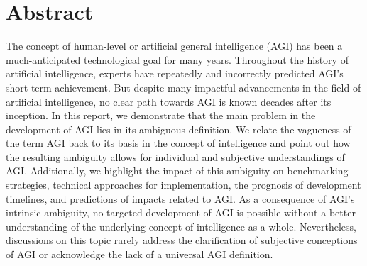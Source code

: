\section*{Abstract}
The concept of human-level or artificial general intelligence (AGI) has been a much-anticipated technological goal for many years.
Throughout the history of artificial intelligence, experts have repeatedly and incorrectly predicted AGI's short-term achievement.
But despite many impactful advancements in the field of artificial intelligence, no clear path towards AGI is known decades after its inception.
In this report, we demonstrate that the main problem in the development of AGI lies in its ambiguous definition.
We relate the vagueness of the term AGI back to its basis in the concept of intelligence and point out how the resulting ambiguity allows for individual and subjective understandings of AGI.
Additionally, we highlight the impact of this ambiguity on benchmarking strategies, technical approaches for implementation, the prognosis of development timelines, and predictions of impacts related to AGI.
As a consequence of AGI's intrinsic ambiguity, no targeted development of AGI is possible without a better understanding of the underlying concept of intelligence as a whole.
Nevertheless, discussions on this topic rarely address the clarification of subjective conceptions of AGI or acknowledge the lack of a universal AGI definition.